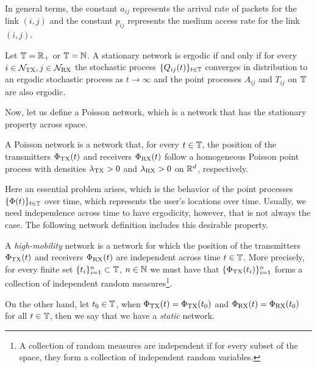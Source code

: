 In general terms, the constant $a_{ij}$ represents the arrival rate of packets for the link $(i,j)$ and the constant $p_{ij}$ represents the medium access rate for the link $(i,j)$.

\begin{definition}
    Let ${\mathbb T}={\mathbb R}_+$ or ${\mathbb T}={\mathbb N}$. A stationary network is ergodic if and only if for every $i\in\mathcal N_{\mathrm{TX}}, j\in\mathcal N_{\mathrm{RX}}$ the stochastic process $\{Q_{ij}(t)\}_{t\in{\mathbb T}}$ converges in distribution to an ergodic stochastic process as $t\to\infty$ and the point processes $A_{ij}$ and $T_{ij}$ on ${\mathbb T}$ are also ergodic.
\end{definition}


Now, let us define a Poisson network, which is a network that has the stationary property across space.
%
\begin{definition}
    A Poisson network is a network that, for every $t\in{\mathbb T}$, the position of the transmitters $\Phi_{\mathrm{TX}}(t)$ and receivers $\Phi_{\mathrm{RX}}(t)$ follow a homogeneous Poisson point process with densities $\lambda_{\mathrm{TX}} > 0$ and $\lambda_{\mathrm{RX}} > 0$ on ${\mathbb R}^d$, respectively.
\end{definition}

Here an essential problem arises, which is the behavior of the point processes $\{\Phi(t)\}_{t\in{\mathbb T}}$ over time, which represents the user's locations over time.
%
Usually, we need independence across time to have ergodicity, however, that is not always the case.
%
The following network definition includes this desirable property.
%
\begin{definition}
    A \textit{high-mobility} network is a network for which the position of the transmitters $\Phi_{\mathrm{TX}}(t)$ and receivers $\Phi_{\mathrm{RX}}(t)$ are independent across time $t\in{\mathbb T}$.
    More precisely, for every finite set $\{t_i\}_{i=1}^n \subset{\mathbb T}$, $n\in{\mathbb N}$ we must have that $\{\Phi_{\mathrm{TX}}(t_i)\}_{i=1}^n$ forms a collection of independent random measures\footnote{A collection of random measures are independent if for every subset of the space, they form a collection of independent random variables.}.
    
    On the other hand, let $t_0\in{\mathbb T}$, when $\Phi_{\mathrm{TX}}(t) = \Phi_{\mathrm{TX}}(t_0)$ and $\Phi_{\mathrm{RX}}(t) = \Phi_{\mathrm{RX}}(t_0)$ for all $t\in{\mathbb T}$, then we say that we have a \textit{static} network.
\end{definition}

